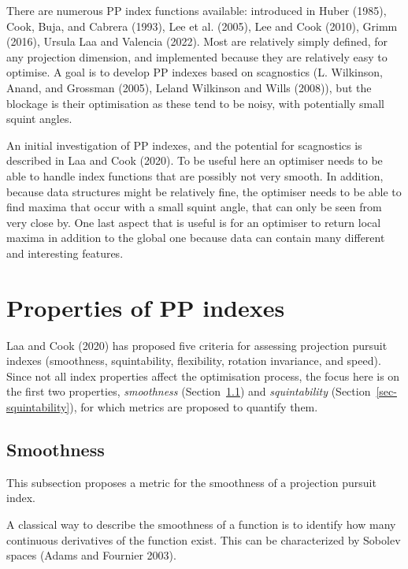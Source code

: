 \documentclass[
  12pt,
]{interact}
\theoremstyle{plain}
\begin{document}
There are numerous PP index functions available: introduced in Huber
(1985), Cook, Buja, and Cabrera (1993), Lee et al. (2005), Lee and Cook
(2010), Grimm (2016), Ursula Laa and Valencia (2022). Most are
relatively simply defined, for any projection dimension, and implemented
because they are relatively easy to optimise. A goal is to develop PP
indexes based on scagnostics (L. Wilkinson, Anand, and Grossman (2005),
Leland Wilkinson and Wills (2008)), but the blockage is their
optimisation as these tend to be noisy, with potentially small squint
angles.

An initial investigation of PP indexes, and the potential for
scagnostics is described in Laa and Cook (2020). To be useful here an
optimiser needs to be able to handle index functions that are possibly
not very smooth. In addition, because data structures might be
relatively fine, the optimiser needs to be able to find maxima that
occur with a small squint angle, that can only be seen from very close
by. One last aspect that is useful is for an optimiser to return local
maxima in addition to the global one because data can contain many
different and interesting features.

\hypertarget{sec-PP-properties}{%
\section{Properties of PP indexes}\label{sec-PP-properties}}

Laa and Cook (2020) has proposed five criteria for assessing projection
pursuit indexes (smoothness, squintability, flexibility, rotation
invariance, and speed). Since not all index properties affect the
optimisation process, the focus here is on the first two properties,
\emph{smoothness} (Section~\ref{sec-smoothness}) and
\emph{squintability} (Section~\ref{sec-squintability}), for which
metrics are proposed to quantify them.

\hypertarget{sec-smoothness}{%
\subsection{Smoothness}\label{sec-smoothness}}

This subsection proposes a metric for the smoothness of a projection
pursuit index.

A classical way to describe the smoothness of a function is to identify
how many continuous derivatives of the function exist. This can be
characterized by Sobolev spaces (Adams and Fournier 2003).
\end{document}
